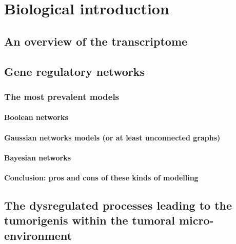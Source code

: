\chapter*{Biological introduction}


\section{An overview of the transcriptome}

\section{Gene regulatory networks}

\subsection{The most prevalent models}

\subsubsection{Boolean networks}

\subsubsection{Gaussian networks models (or at least unconnected graphs)}
\subsubsection{Bayesian networks}

\subsubsection{Conclusion: pros and cons of these kinds of modelling}

\section{The dysregulated processes leading to the tumorigenis within the tumoral micro-environment}

